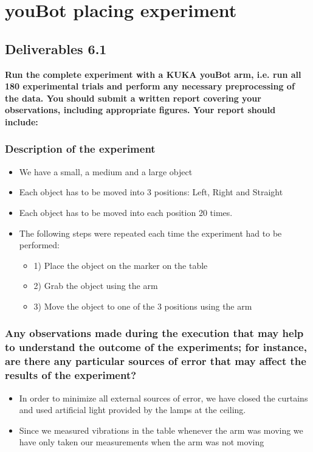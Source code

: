 \chapter{youBot placing experiment}
\section{Deliverables 6.1}
\textbf{Run the complete experiment with a KUKA youBot arm, i.e. run all 180 experimental trials and perform any necessary preprocessing of the data. You should submit a written report covering your observations, including appropriate figures. Your report should include:}

\subsection{Description of the experiment}

\begin{itemize}
	\item We have a small, a medium and a large object
	\item Each object has to be moved into 3 positions: Left, Right and Straight
	\item Each object has to be moved into each position 20 times.
	\item The following steps were repeated each time the experiment had to be performed:
	\begin{itemize}
		\item 1) Place the object on the marker on the table
		\item 2) Grab the object using the arm
		\item 3) Move the object to one of the 3 positions using the arm
	\end{itemize}
\end{itemize}


\subsection{Any observations made during the execution that may help to understand the outcome of the experiments; for instance, are there any particular sources of error that may affect the results of the experiment?}

\begin{itemize}
	\item In order to minimize all external sources of error, we have closed the curtains and used artificial light provided by the lamps at the ceiling.
	\item Since we measured vibrations in the table whenever the arm was moving we have only taken our measurements when the arm was not moving
\end{itemize}






